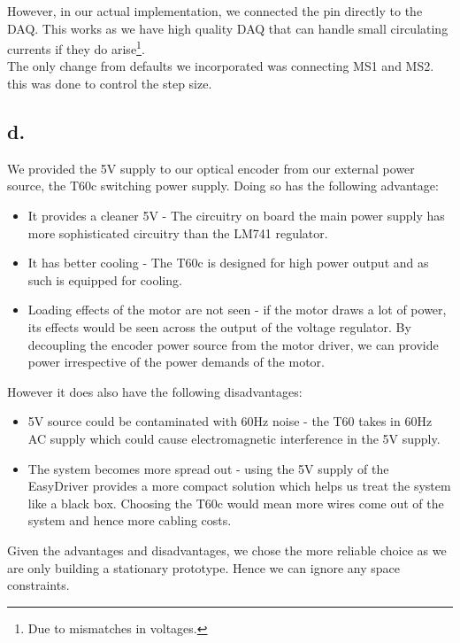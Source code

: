 \documentclass{article}
\theoremstyle{plain}
\theoremstyle{definition}
\theoremstyle{remark}
\begin{document}
 However, in our actual implementation, we connected the pin directly to the DAQ. This works as we have high quality DAQ that can handle small circulating currents if they do arise\footnote{Due to mismatches in voltages.}.\\

The only change from defaults we incorporated was connecting MS1 and MS2. this was done to control the step size. 


\subsection*{d.}
We provided the 5V supply to our optical encoder from our external power source, the T60c switching power supply. Doing so has the following advantage:
\begin{itemize}
\item It provides a cleaner 5V - The circuitry on board the main power supply has more sophisticated circuitry than the LM741 regulator.

\item It has better cooling - The T60c is designed for high power output and as such is equipped for cooling.

\item Loading effects of the motor are not seen - if the motor draws a lot of power, its effects would be seen across the output of the voltage regulator. By decoupling the encoder power source from the motor driver, we can provide power irrespective of the power demands of the motor.
\end{itemize}

However it does also have the following disadvantages:
\begin{itemize}
\item 5V source could be contaminated with 60Hz noise - the T60 takes in 60Hz AC supply which could cause electromagnetic interference in the 5V supply.

\item The system becomes more spread out - using the 5V supply of the EasyDriver provides a more compact solution which helps us treat the system like a black box. Choosing the T60c would mean more wires come out of the system and hence more cabling costs.

\end{itemize}

Given the advantages and disadvantages, we chose the more reliable choice as we are only building a stationary prototype. Hence we can ignore any space constraints.
\end{document}
